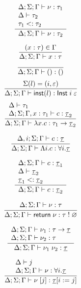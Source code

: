 \[\frac{
	\begin{array}{l}
	\Delta;\Sigma;\Gamma \vdash \nu : \tau_1 \\
	\Delta \vdash \tau_2 \\
	\tau_1 <: \tau_2
	\end{array}
}{
	\Delta;\Sigma;\Gamma \vdash \nu : \tau_2
}\]

\[\frac{
	(x:\tau) \in \Gamma
}{
	\Delta;\Sigma;\Gamma \vdash x : \tau
}\]
\[\frac{
}{
	\Delta;\Sigma;\Gamma \vdash () : ()
}\]
\[\frac{
	\Sigma(l) = (i, \varepsilon)
}{
	\Delta;\Sigma;\Gamma \vdash \mathsf{inst}(l) : \mathsf{Inst} \; i \; \varepsilon
}\]
\[\frac{
	\begin{array}{l}
	\Delta \vdash \tau_1 \\
	\Delta;\Sigma;\Gamma, x : \tau_1 \vdash c : \underline{\tau}_2
	\end{array}
}{
	\Delta;\Sigma;\Gamma \vdash \lambda x . c : \tau_1 \rightarrow \underline{\tau}_2
}\]

\[\frac{
	\begin{array}{l}
	\Delta,i;\Sigma;\Gamma \vdash c : \underline{\tau}
	\end{array}
}{
	\Delta;\Sigma;\Gamma \vdash \Lambda i . c : \forall i . \underline{\tau}
}\]

\[\frac{
	\begin{array}{l}
	\Delta;\Sigma;\Gamma \vdash c : \underline{\tau}_1 \\
	\Delta \vdash \underline{\tau}_2 \\
	\underline{\tau}_1 <: \underline{\tau}_2
	\end{array}
}{
	\Delta;\Sigma;\Gamma \vdash c : \underline{\tau}_2
}\]

\[\frac{
	\begin{array}{l}
	\Delta;\Sigma;\Gamma \vdash \nu : \tau
	\end{array}
}{
	\Delta;\Sigma;\Gamma \vdash \mathsf{return} \; \nu : \tau \; ! \; \varnothing
}\]

\[\frac{
	\begin{array}{l}
	\Delta;\Sigma;\Gamma \vdash \nu_1 : \tau \rightarrow \underline{\tau}\\
	\Delta;\Sigma;\Gamma \vdash \nu_2 : \tau
	\end{array}
}{
	\Delta;\Sigma;\Gamma \vdash \nu_1 \; \nu_2 : \underline{\tau}
}\]

\[\frac{
	\begin{array}{l}
	\Delta \vdash j \\
	\Delta;\Sigma;\Gamma \vdash \nu : \forall i . \underline{\tau}
	\end{array}
}{
	\Delta;\Sigma;\Gamma \vdash \nu \; [ j ] : \underline{\tau}[i := j]
}\]

